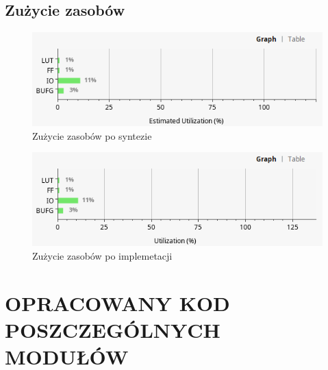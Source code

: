 \documentclass{article}
\begin{document}
\subsection{Zużycie zasobów}
\begin{figure} [H]
	\begin{center}
			\includegraphics[width = \textwidth]{zasobyPoSynth.png}
			\caption{Zużycie zasobów po syntezie}
\end{center}
\end{figure}
\begin{figure} [H]
	\begin{center}
			\includegraphics[width = \textwidth]{zasobyPoImpl.png}
			\caption{Zużycie zasobów po implemetacji}
\end{center}
\end{figure}
\section{OPRACOWANY KOD POSZCZEGÓLNYCH MODUŁÓW}
\end{document}

